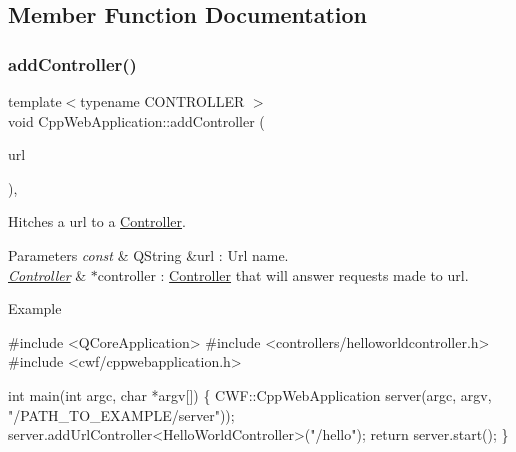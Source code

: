 \subsection{Member Function Documentation}
\mbox{\label{class_cpp_web_application_ab4f105dee5ddd0cb7c6c93917057e850}} 
\subsubsection{\texorpdfstring{add\+Controller()}{addController()}}
{\footnotesize\ttfamily template$<$typename C\+O\+N\+T\+R\+O\+L\+L\+ER $>$ \\
void Cpp\+Web\+Application\+::add\+Controller (\begin{DoxyParamCaption}\item[{const Q\+String \&}]{url }\end{DoxyParamCaption})\hspace{0.3cm}{\ttfamily [inline]}, {\ttfamily [noexcept]}}



Hitches a url to a \hyperlink{class_controller}{Controller}. 


\begin{DoxyParams}{Parameters}
{\em const} & Q\+String \&url \+: Url name. \\
\hline
{\em \hyperlink{class_controller}{Controller}} & $\ast$controller \+: \hyperlink{class_controller}{Controller} that will answer requests made to url. \\
\hline
\end{DoxyParams}
\begin{DoxyParagraph}{Example}

\begin{DoxyCode}
\textcolor{preprocessor}{#include <QCoreApplication>}
\textcolor{preprocessor}{#include <controllers/helloworldcontroller.h>}
\textcolor{preprocessor}{#include <cwf/cppwebapplication.h>}

\textcolor{keywordtype}{int} main(\textcolor{keywordtype}{int} argc, \textcolor{keywordtype}{char} *argv[])
\{
     CWF::CppWebApplication server(argc, argv, \textcolor{stringliteral}{"/PATH\_TO\_EXAMPLE/server"}));
     server.addUrlController<HelloWorldController>(\textcolor{stringliteral}{"/hello"});
     \textcolor{keywordflow}{return} server.start();
\}
\end{DoxyCode}
 
\end{DoxyParagraph}
\mbox{\label{class_cpp_web_application_a1e9f2c789934748d6b7c29ad33e9d7c9}} 
